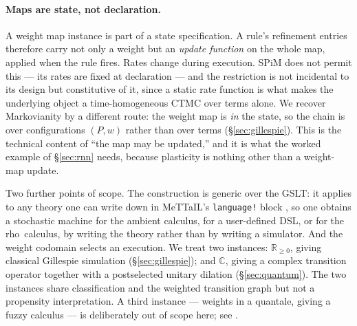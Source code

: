 \documentclass[11pt,a4paper]{article}
\theoremstyle{plain}
\theoremstyle{definition}
\theoremstyle{remark}
\newcommand{\rhoc}{\textsf{rho}}
\newcommand{\Rnn}{\mathbb{R}_{\geq 0}}
\newcommand{\Cx}{\mathbb{C}}
\newcommand{\wmap}{w}
\begin{document}
\paragraph{Maps are state, not declaration.} A weight map instance is part of a state
specification. A rule's refinement entries therefore carry not only a weight but an \emph{update
function} on the whole map, applied when the rule fires. Rates change during execution. SPiM does
not permit this --- its rates are fixed at declaration --- and the restriction is not incidental to
its design but constitutive of it, since a static rate function is what makes the underlying object
a time-homogeneous CTMC over terms alone. We recover Markovianity by a different route: the weight
map is \emph{in} the state, so the chain is over configurations $(P, \wmap)$ rather than over terms
(\S\ref{sec:gillespie}). This is the technical content of ``the map may be updated,'' and it is what
the worked example of \S\ref{sec:rnn} needs, because plasticity is nothing other than a weight-map
update.

Two further points of scope. The construction is generic over the GSLT: it applies to any theory
one can write down in MeTTaIL's \texttt{language!} block \cite{mettail}, so one obtains a stochastic
machine for the ambient calculus, for a user-defined DSL, or for the \rhoc\ calculus, by writing the
theory rather than by writing a simulator. And the weight codomain selects an execution. We treat two
instances: $\Rnn$, giving classical Gillespie simulation (\S\ref{sec:gillespie}); and $\Cx$, giving
a complex transition operator together with a postselected unitary dilation
(\S\ref{sec:quantum}). The two instances share classification and the weighted transition graph but
not a propensity interpretation. A third instance --- weights in a quantale, giving a fuzzy calculus
--- is deliberately out of scope here; see \cite{fuzzy}.
\end{document}

